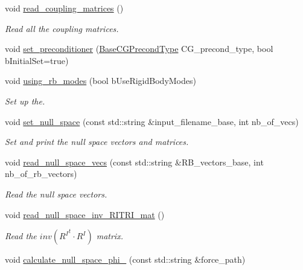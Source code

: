 \begin{DoxyCompactItemize}
void \hyperlink{classcarl_1_1_f_e_t_i___operations_a3feae6ca919b9439b79f02f55b20677f}{read\+\_\+coupling\+\_\+matrices} ()
\begin{DoxyCompactList}\small\item\em Read all the coupling matrices. \end{DoxyCompactList}\item 
void \hyperlink{classcarl_1_1_f_e_t_i___operations_a55fb42247284b7468ebe6440b7c48bef}{set\+\_\+preconditioner} (\hyperlink{namespacecarl_ad52f21755b51ffa926038b59ae194ea8}{Base\+C\+G\+Precond\+Type} C\+G\+\_\+precond\+\_\+type, bool b\+Initial\+Set=true)
\item 
void \hyperlink{classcarl_1_1_f_e_t_i___operations_a548253e562c086929dd880e1f5598630}{using\+\_\+rb\+\_\+modes} (bool b\+Use\+Rigid\+Body\+Modes)
\begin{DoxyCompactList}\small\item\em Set up the. \end{DoxyCompactList}\item 
void \hyperlink{classcarl_1_1_f_e_t_i___operations_ae25ef4a40f61e29f445e82758eab5151}{set\+\_\+null\+\_\+space} (const std\+::string \&input\+\_\+filename\+\_\+base, int nb\+\_\+of\+\_\+vecs)
\begin{DoxyCompactList}\small\item\em Set and print the null space vectors and matrices. \end{DoxyCompactList}\item 
void \hyperlink{classcarl_1_1_f_e_t_i___operations_a265fad70304acb55178dfe0126c83d0d}{read\+\_\+null\+\_\+space\+\_\+vecs} (const std\+::string \&R\+B\+\_\+vectors\+\_\+base, int nb\+\_\+of\+\_\+rb\+\_\+vectors)
\begin{DoxyCompactList}\small\item\em Read the null space vectors. \end{DoxyCompactList}\item 
void \hyperlink{classcarl_1_1_f_e_t_i___operations_a9b32c7f7321f1eb9e068708293485013}{read\+\_\+null\+\_\+space\+\_\+inv\+\_\+\+R\+I\+T\+R\+I\+\_\+mat} ()
\begin{DoxyCompactList}\small\item\em Read the $ inv({R^I}^t \cdot R^I)$ matrix. \end{DoxyCompactList}\item 
void \hyperlink{classcarl_1_1_f_e_t_i___operations_a4861d98ffa8596f62cbb1f0852459da2}{calculate\+\_\+null\+\_\+space\+\_\+phi\+\_} (const std\+::string \&force\+\_\+path)

\end{DoxyCompactItemize}
